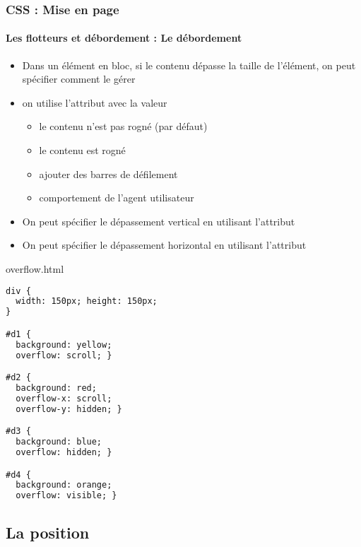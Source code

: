 \documentclass[xcolor=table]{beamer}
\begin{document}
\begin{frame}[fragile]
\frametitle{CSS : Mise en page}
\framesubtitle{Les flotteurs et débordement : Le débordement}

\begin{minipage}{0.60\textwidth}
	\begin{itemize}
		\item Dans un élément en bloc, si le contenu dépasse la taille de l'élément, on peut spécifier comment le gérer
		\item on utilise l'attribut  avec la valeur
		\begin{itemize}
			\item {} le contenu n'est pas rogné (par défaut)
			\item {} le contenu est rogné
			\item {} ajouter des barres de défilement
			\item {} comportement de l'agent utilisateur
		\end{itemize}
		\item On peut spécifier le dépassement vertical en utilisant l'attribut 
		\item On peut spécifier le dépassement horizontal en utilisant l'attribut 
	\end{itemize}
\end{minipage}
%
\begin{minipage}{0.38\textwidth}
	\begin{block}{overflow.html}
		\lstset{escapeinside=**}
		\tiny\bfseries
\begin{lstlisting}[language={html}]
div {
  width: 150px; height: 150px;
}

#d1 {
  background: yellow;
  overflow: scroll; }

#d2 {
  background: red;
  overflow-x: scroll;
  overflow-y: hidden; }

#d3 {
  background: blue;
  overflow: hidden; }

#d4 {
  background: orange;
  overflow: visible; }
\end{lstlisting}
	\end{block}
\end{minipage}
\end{frame}

\subsection{La position}
\end{document}
